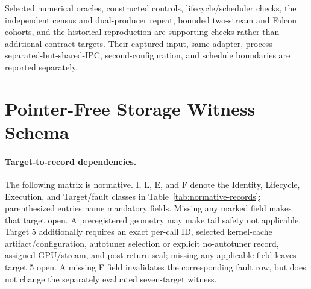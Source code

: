 \documentclass{article}
\begin{document}
Selected numerical oracles, constructed controls, lifecycle/scheduler checks,
the independent census and dual-producer repeat, bounded two-stream and Falcon
cohorts, and the historical reproduction are supporting checks rather than
additional contract targets.  Their captured-input, same-adapter,
process-separated-but-shared-IPC, second-configuration, and schedule boundaries
are reported separately.

\section{Pointer-Free Storage Witness Schema}
\label{app:storage-schema}

\paragraph{Target-to-record dependencies.}
The following matrix is normative.  I, L, E, and F denote the Identity,
Lifecycle, Execution, and Target/fault classes in Table~\ref{tab:normative-records};
parenthesized entries name mandatory fields.  Missing any marked field makes
that target open.  A preregistered geometry may make tail safety not applicable.
Target 5 additionally requires an exact per-call ID, selected kernel-cache
artifact/configuration, autotuner selection or explicit no-autotuner record,
assigned GPU/stream, and post-return seal; missing any applicable field leaves
target 5 open.  A missing F field invalidates the corresponding fault row,
but does not change the separately evaluated seven-target witness.
\end{document}
